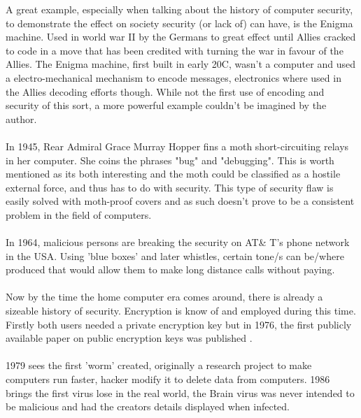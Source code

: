 A great example, especially when talking about the history of computer security, to demonstrate the effect on society security (or lack of) can have, is the Enigma machine. Used in world war II by the Germans to great effect until Allies cracked to code in a move that has been credited with turning the war in favour of the Allies. The Enigma machine, first built in early 20C, wasn't a computer and used a electro-mechanical mechanism to encode messages, electronics where used in the Allies decoding efforts though. While not the first use of encoding and security of this sort, a more powerful example couldn't be imagined by the author. \\\\

In 1945, Rear Admiral Grace Murray Hopper fins a moth short-circuiting relays in her computer. She coins the phrases "bug" and "debugging". This is worth mentioned as its both interesting and the moth could be classified as a hostile external force, and thus has to do with security. This type of security flaw is easily solved with moth-proof covers and as such doesn't prove to be a consistent problem in the field of computers. \\\\

In 1964, malicious persons are breaking the security on AT\& T's phone network in the USA. Using 'blue boxes' and later whistles, certain tone/s can be/where produced that would allow them to make long distance calls without paying. \\\\

Now by the time the home computer era comes around, there is already a sizeable history of security. Encryption is know of and employed during this time. Firstly both users needed a private encryption key but in 1976, the first publicly available paper on public encryption keys was published \cite{diffie}. \\\\

 1979 sees the first 'worm' created, originally a research project to make computers run faster, hacker modify it to delete data from computers.  1986 brings the first virus lose in the real world, the Brain virus was never intended to be malicious and had the creators details displayed when infected.

